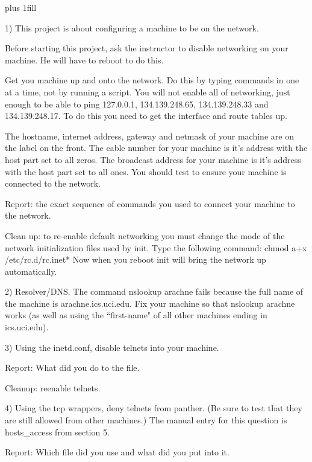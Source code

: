 
\rightskip=0pt plus 1fill

\parindent 0pt

1) This project is about configuring a machine to be on the network.

Before starting this project, ask the instructor to disable networking
on your machine. He will have to reboot to do this.

Get you machine up and onto the network.
Do this by typing commands in one at a time, not by running a script.
You will not enable all of networking, just enough to be
able to ping {\ltt{}127.0.0.1}, {\ltt{}134.139.248.65},
{\ltt{}134.139.248.33} and {\ltt{}134.139.248.17}.
To do this you need to get the interface and route tables up.

The hostname, internet address, gateway and netmask of your machine are
on the label on the front.
The cable number for your machine is it's address with the host
part set to all zeros.
The broadcast address for your machine is it's address with the host
part set to all ones.
You should test to ensure your machine is connected to the network.

Report: the exact sequence of commands you used to connect your machine
to the network.

Clean up: to re-enable default networking you must change the mode
of the network initialization files used by {\ltt{}init}.
Type the following command:
\hfill\break
{\ltt{}chmod a+x /etc/rc.d/rc.inet*}
\hfill\break
Now when you reboot {\ltt{}init} will bring the network up automatically.

2) Resolver/DNS. The command {\ltt{}nslookup arachne} fails because the full
name of the machine is {\ltt{}arachne.ics.uci.edu}.
Fix your machine so that {\ltt{}nslookup arachne} works (as well as using
the ``first-name" of all other machines ending in {\ltt{}ics.uci.edu}).

3) Using the {\ltt{}inetd.conf}, disable telnets into your machine.

Report: What did you do to the file.

Cleanup: reenable telnets.

4) Using the tcp wrappers, deny telnets from {\ltt{}panther}. (Be sure to test
that they are still allowed from other machines.)
The manual entry for this question is {\ltt{}hosts_access} from section 5.

Report: Which file did you use and what did you put into it.

